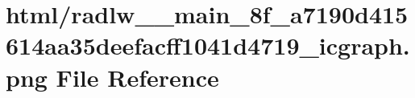 \hypertarget{radlw____main__8f__a7190d415614aa35deefacff1041d4719__icgraph_8png}{}\section{html/radlw\+\_\+\+\_\+main\+\_\+8f\+\_\+a7190d415614aa35deefacff1041d4719\+\_\+icgraph.png File Reference}
\label{radlw____main__8f__a7190d415614aa35deefacff1041d4719__icgraph_8png}
